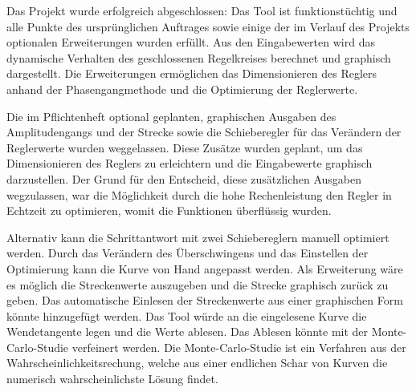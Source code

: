 Das Projekt  wurde erfolgreich abgeschlossen: Das Tool  ist funktionst\"uchtig
und alle Punkte des urspr\"unglichen Auftrages sowie einige der im Verlauf des
Projekts  optionalen  Erweiterungen  wurden erf\"ullt. Aus  den  Eingabewerten
wird  das dynamische  Verhalten des  geschlossenen Regelkreises  berechnet und
graphisch dargestellt. Die Erweiterungen  erm\"oglichen das Dimensionieren des
Reglers anhand der Phasengangmethode und die Optimierung der Reglerwerte.


Die   im   Pflichtenheft   optional  geplanten,   graphischen   Ausgaben   des
Amplitudengangs und der Strecke sowie  die Schieberegler f\"ur das Ver\"andern
der  Reglerwerte wurden  weggelassen. Diese Zus\"atze  wurden geplant,  um das
Dimensionieren  des  Reglers zu  erleichtern  und  die Eingabewerte  graphisch
darzustellen. Der  Grund f\"ur  den Entscheid,  diese zus\"atzlichen  Ausgaben
wegzulassen, war die M\"oglichkeit durch die hohe Rechenleistung den Regler in
Echtzeit zu optimieren, womit die Funktionen \"uberfl\"ussig wurden.


Alternativ kann  die Schrittantwort mit zwei  Schiebereglern manuell optimiert
werden. Durch  das Ver\"andern  des  \"Uberschwingens und  das Einstellen  der
Optimierung kann die Kurve von  Hand angepasst werden.  Als Erweiterung w\"are
es m\"oglich die  Streckenwerte auszugeben und die  Strecke graphisch zur\"uck
zu geben. Das  automatische Einlesen  der Streckenwerte aus  einer graphischen
Form k\"onnte hinzugef\"ugt werden. Das Tool  w\"urde an die eingelesene Kurve
die Wendetangente  legen und die  Werte ablesen. Das Ablesen k\"onnte  mit der
Monte-Carlo-Studie verfeinert werden. Die Monte-Carlo-Studie ist ein Verfahren
aus  der  Wahrscheinlichkeitsrechung, welche  aus  einer  endlichen Schar  von
Kurven die numerisch wahrscheinlichste L\"osung findet.
